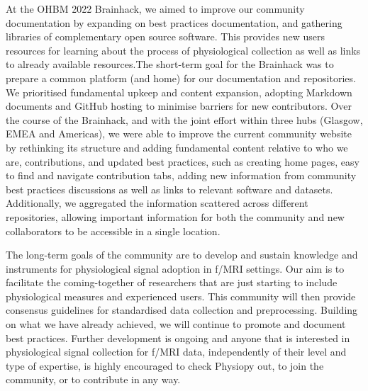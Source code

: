 \documentclass[../main.tex]{subfiles}
\begin{document}
At the OHBM 2022 Brainhack, we aimed to improve our community documentation by expanding on best practices documentation, and gathering libraries of complementary open source software. This provides new users resources for learning about the process of physiological collection as well as links to already available resources.The short-term goal for the Brainhack was to prepare a common platform (and home) for our documentation and repositories. We prioritised fundamental upkeep and content expansion, adopting Markdown documents and GitHub hosting to minimise barriers for new contributors. Over the course of the Brainhack, and with the joint effort within three hubs (Glasgow, EMEA and Americas), we were able to improve the current community website by rethinking its structure and adding fundamental content relative to who we are, contributions, and updated best practices, such as creating home pages, easy to find and navigate contribution tabs, adding new information from community best practices discussions as well as links to relevant software and datasets. Additionally, we  aggregated the information scattered across different repositories, allowing important information for both the community and new collaborators to be accessible in a single location. 

The long-term goals of the community are to develop and sustain knowledge and instruments for physiological signal adoption in f/MRI settings. Our aim is to facilitate the coming-together of researchers that are just starting to include physiological measures and experienced users. This community will then provide consensus guidelines for standardised data collection and preprocessing. Building on what we have already achieved, we will continue to promote and document best practices. Further development is ongoing and anyone that is interested in physiological signal collection for f/MRI data, independently of their level and type of expertise, is highly encouraged to check Physiopy out, to join the community, or to contribute in any way.
\end{document}
